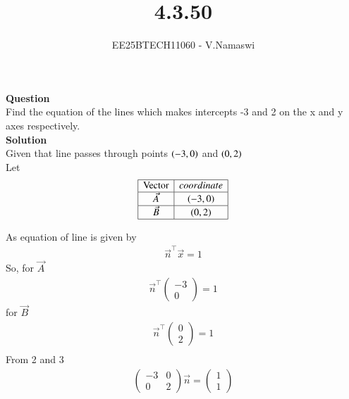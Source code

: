 \documentclass[journal]{IEEEtran}
\begin{document}

\vspace{3cm}

\title{4.3.50}
\author{EE25BTECH11060 - V.Namaswi}
{\let\newpage\relax\maketitle}
\renewcommand{\thefigure}{\theenumi}
\renewcommand{\thetable}{\theenumi}
\setlength{\intextsep}{10pt} %
\textbf{Question}\\ Find the equation of the lines which makes intercepts -3 and 2 on the x and y axes respectively.\\
\textbf{Solution}\\
Given that line passes through points $\left(-3,0\right)$ and $\left(0,2\right)$ \\
Let
\[
\begin{array}{|c|c|}
\hline
\text{Vector} & coordinate \\ \hline
\Vec{A} & (-3, 0) \\ \hline
\Vec{B} & (0, 2) \\ \hline
\end{array}
\]

As equation of line is given by 
\begin{align}
    \vec{n}^\top \vec{x}=1
\end{align}
 So, for $\vec{A}$ 
 \begin{align}
 \vec{n}^\top\begin{pmatrix}
     -3  \\ 0
 \end{pmatrix}=1
  \end{align}
  for $\vec{B}$
 \begin{align}
  \vec{n}^\top\begin{pmatrix}
     0  \\  2
 \end{pmatrix}=1\\
 \end{align}
 From 2 and 3\\
 \begin{align}
 \begin{pmatrix}
     -3 & 0 \\
     0 & 2 
 \end{pmatrix} \vec{n}=\begin{pmatrix}
     1 \\ 1
 \end{pmatrix}
 \end{align}
\end{document}
